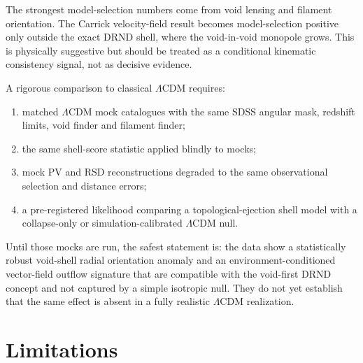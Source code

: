 \documentclass[11pt,a4paper]{article}
\begin{document}
The strongest model-selection numbers come from void lensing and filament orientation. The Carrick velocity-field result becomes model-selection positive only outside the exact DRND shell, where the void-in-void monopole grows. This is physically suggestive but should be treated as a conditional kinematic consistency signal, not as decisive evidence.

A rigorous comparison to classical $\Lambda$CDM requires:
\begin{enumerate}[leftmargin=1.2cm]
  \item matched $\Lambda$CDM mock catalogues with the same SDSS angular mask, redshift limits, void finder and filament finder;
  \item the same shell-score statistic applied blindly to mocks;
  \item mock PV and RSD reconstructions degraded to the same observational selection and distance errors;
  \item a pre-registered likelihood comparing a topological-ejection shell model with a collapse-only or simulation-calibrated $\Lambda$CDM null.
\end{enumerate}

Until those mocks are run, the safest statement is: the data show a statistically robust void-shell radial orientation anomaly and an environment-conditioned vector-field outflow signature that are compatible with the void-first DRND concept and not captured by a simple isotropic null. They do not yet establish that the same effect is absent in a fully realistic $\Lambda$CDM realization.

\section{Limitations}
\end{document}
